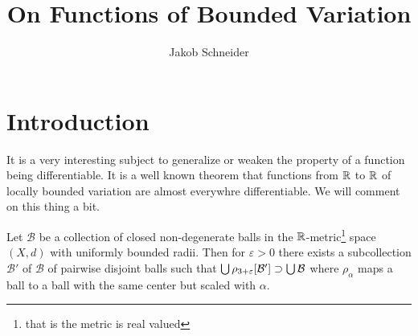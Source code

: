\documentclass[a4paper,11pt]{article}
\title{On Functions of Bounded Variation}
\author{Jakob Schneider}
\begin{document}
\maketitle
\tableofcontents

\section{Introduction}

It is a very interesting subject to generalize or weaken the property of a function being differentiable. It is a well known theorem that functions from $\mathbb{R}$ to $\mathbb{R}$ of locally bounded variation are almost everywhre differentiable. We will comment on this thing a bit.

\begin{theorem}
Let $\mathcal{B}$ be a collection of closed non-degenerate balls in the $\mathbb{R}$-metric\footnote{that is the metric is real valued} space $(X,d)$ with uniformly bounded radii. Then for $\varepsilon>0$ there exists a subcollection $\mathcal{B}'$ of $\mathcal{B}$ of pairwise disjoint balls such that $\bigcup\rho_{3+\varepsilon}[\mathcal{B}']\supset\bigcup\mathcal{B}$ where $\rho_\alpha$ maps a ball to a ball with the same center but scaled with $\alpha$.
\end{theorem}
\end{document}
